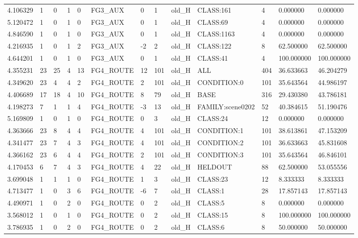 \begin{tabular}{lllllllllllll}
4.106329 & 1 & 0 & 1 & 0 & FG3\_AUX & 0 & 1 & old\_H & CLASS:161 & 4 & 0.000000 & 0.000000 \\
5.120472 & 1 & 0 & 1 & 0 & FG3\_AUX & 0 & 1 & old\_H & CLASS:69 & 4 & 0.000000 & 0.000000 \\
4.846590 & 1 & 0 & 1 & 0 & FG3\_AUX & 0 & 1 & old\_H & CLASS:1163 & 4 & 0.000000 & 0.000000 \\
4.216935 & 1 & 0 & 1 & 2 & FG3\_AUX & -2 & 2 & old\_H & CLASS:122 & 8 & 62.500000 & 62.500000 \\
4.644201 & 1 & 0 & 1 & 0 & FG3\_AUX & 0 & 1 & old\_H & CLASS:41 & 4 & 100.000000 & 100.000000 \\
4.355231 & 23 & 25 & 4 & 13 & FG4\_ROUTE & 12 & 101 & old\_H & ALL & 404 & 36.633663 & 46.204279 \\
4.349620 & 23 & 4 & 4 & 2 & FG4\_ROUTE & 2 & 101 & old\_H & CONDITION:0 & 101 & 35.643564 & 44.986197 \\
4.406689 & 17 & 18 & 4 & 10 & FG4\_ROUTE & 8 & 79 & old\_H & BASE & 316 & 29.430380 & 43.786181 \\
4.198273 & 7 & 1 & 1 & 4 & FG4\_ROUTE & -3 & 13 & old\_H & FAMILY:scene0202 & 52 & 40.384615 & 51.190476 \\
5.169809 & 1 & 0 & 1 & 0 & FG4\_ROUTE & 0 & 3 & old\_H & CLASS:24 & 12 & 0.000000 & 0.000000 \\
4.363666 & 23 & 8 & 4 & 4 & FG4\_ROUTE & 4 & 101 & old\_H & CONDITION:1 & 101 & 38.613861 & 47.153209 \\
4.341477 & 23 & 7 & 4 & 3 & FG4\_ROUTE & 4 & 101 & old\_H & CONDITION:2 & 101 & 36.633663 & 45.831608 \\
4.366162 & 23 & 6 & 4 & 4 & FG4\_ROUTE & 2 & 101 & old\_H & CONDITION:3 & 101 & 35.643564 & 46.846101 \\
4.170453 & 6 & 7 & 4 & 3 & FG4\_ROUTE & 4 & 22 & old\_H & HELDOUT & 88 & 62.500000 & 53.055556 \\
3.699048 & 1 & 1 & 1 & 0 & FG4\_ROUTE & 1 & 3 & old\_H & CLASS:23 & 12 & 8.333333 & 8.333333 \\
4.713477 & 1 & 0 & 3 & 6 & FG4\_ROUTE & -6 & 7 & old\_H & CLASS:1 & 28 & 17.857143 & 17.857143 \\
4.490971 & 1 & 0 & 2 & 0 & FG4\_ROUTE & 0 & 2 & old\_H & CLASS:5 & 8 & 0.000000 & 0.000000 \\
3.568012 & 1 & 0 & 1 & 0 & FG4\_ROUTE & 0 & 2 & old\_H & CLASS:15 & 8 & 100.000000 & 100.000000 \\
3.786935 & 1 & 0 & 2 & 0 & FG4\_ROUTE & 0 & 2 & old\_H & CLASS:6 & 8 & 50.000000 & 50.000000 \\

\end{tabular}
